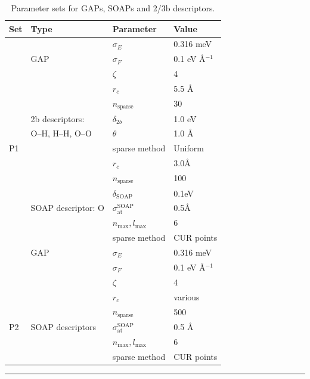 \documentclass[../../main.tex]{subfiles}
\begin{document}
\begin{table}[h!]
	\def\arraystretch{1.5}
	\begin{tabularx}{\textwidth}{YYYY}
		\hline
		Set	   &Type&	Parameter	&Value\\
		\hline
		
		&        	&$\sigma_E$	&0.316 meV
\\
	   &GAP   & $\sigma_F$	&0.1 eV \AA${}^{-1}$
\\
	    &           & $\zeta$    &  	4
\\
	    &	       &   $r_c$	&  5.5 \AA \\
	   &                 & $n_\text{sparse}$&	30
\\
	    &2b descriptors: & $\delta_{2b}$ &	1.0 eV
\\
      	& O--H, H--H, O--O   &$\theta$	    & 1.0 \AA  \\
	P1 &                        &sparse method	& Uniform
\\

         &							& $r_c$&3.0\AA\\
        &						& $n_\text{sparse}$ &100\\
		&						&  $\delta_\text{SOAP}$&0.1eV\\
		&SOAP descriptor: O&$\sigma_\text{at}^\text{SOAP}$&0.5\AA\\
		&&$n_\text{max}, l_\text{max}$& 6 \\
	    &                      &  sparse method	    & CUR points
 \\
	 \hline
	    &	 GAP	   &  $\sigma_E$	&        0.316 meV  \\
        &	               &   $\sigma_F$	&  	0.1 eV \AA${}^{-1}$
 \\
	     &                  & $\zeta$         & 	4
  \\
	    &                   &	$r_c$	             & various
\\
     	&                  & $n_\text{sparse}$	       &500
\\
	P2 &SOAP descriptors  &$\sigma_\text{at}^\text{SOAP}$	&0.5 \AA
\\
	    &                   &$n_\text{max}, l_\text{max}$&6
\\
	   &                    &sparse method	&CUR points
	\end{tabularx}
	\hrule
	\caption{Parameter sets for GAPs, SOAPs and 2/3b descriptors.}
	\label{table::ml_si_1}
\end{table}
\end{document}
